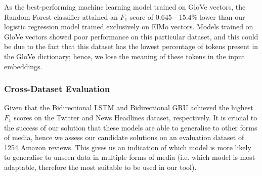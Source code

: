 \documentclass[12pt,a4paper]{article}
\begin{document}
\noindent As the best-performing machine learning model trained on GloVe vectors, the Random Forest classifier attained an $F_1$ score of 0.645 - 15.4\% lower than our logistic regression model trained exclusively on ElMo vectors. Models trained on GloVe vectors showed poor performance on this particular dataset, and this could be due to the fact that this dataset has the lowest percentage of tokens present in the GloVe dictionary; hence, we lose the meaning of these tokens in the input embeddings.




\subsubsection{Cross-Dataset Evaluation}
Given that the Bidirectional LSTM and Bidirectional GRU achieved the highest $F_1$ scores on the Twitter and News Headlines dataset, respectively. It is crucial to the success of our solution that these models are able to generalise to other forms of media, hence we assess our candidate solutions on an evaluation dataset of 1254 Amazon reviews. This gives us an indication of which model is more likely to generalise to unseen data in multiple forms of media (i.e. which model is most adaptable, therefore the most suitable to be used in our tool).
\end{document}
